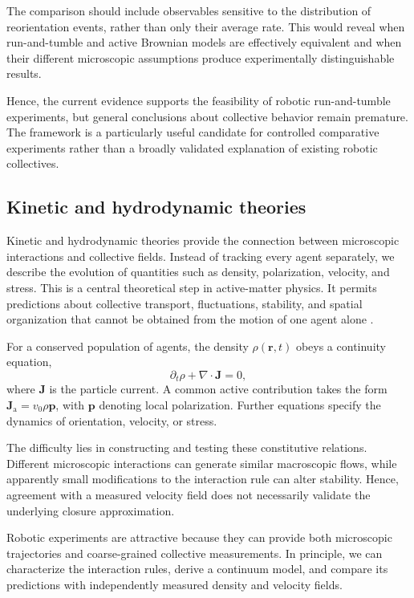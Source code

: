 The comparison should
include observables
sensitive to the
distribution of
reorientation events,
rather than only
their average rate.
This would reveal
when run-and-tumble
and active Brownian
models are effectively
equivalent and when
their different
microscopic assumptions
produce experimentally
distinguishable results.

Hence, the current
evidence supports
the feasibility
of robotic run-and-tumble
experiments, but
general conclusions
about collective
behavior remain
premature. The
framework is a
particularly useful
candidate for
controlled comparative
experiments rather
than a broadly
validated explanation
of existing robotic
collectives.

\subsection{Kinetic and hydrodynamic theories}
\label{sec:theory-kinetic}

Kinetic and hydrodynamic theories provide the connection
between microscopic interactions and collective fields.
Instead of tracking every agent separately, we describe
the evolution of quantities such as density, polarization,
velocity, and stress. This is a central theoretical
step in active-matter physics. It permits predictions
about collective transport, fluctuations, stability,
and spatial organization that cannot be obtained
from the motion of one agent alone
\cite{Toner1995longrange}
\cite{Marchetti2013hydrodynamics}
\cite{Marchetti2013hydrodynamics}.

For a conserved population of agents, the density
$\rho(\mathbf r,t)$ obeys a continuity equation,
\begin{equation}
\partial_t\rho+
\nabla\cdot\mathbf J=0,
\label{eq:theory-continuity}
\end{equation}
where $\mathbf J$ is the particle current.
A common active contribution takes the form
$\mathbf J_{\mathrm a}=v_0\rho\mathbf p$,
with $\mathbf p$ denoting local polarization.
Further equations specify the dynamics of
orientation, velocity, or stress.

The difficulty lies in constructing and testing
these constitutive relations. Different microscopic
interactions can generate similar macroscopic
flows, while apparently small modifications
to the interaction rule can alter stability.
Hence, agreement with a measured velocity
field does not necessarily validate the
underlying closure approximation.

Robotic experiments are attractive because
they can provide both microscopic trajectories
and coarse-grained collective measurements.
In principle, we can characterize the
interaction rules, derive a continuum model,
and compare its predictions with independently
measured density and velocity fields.


